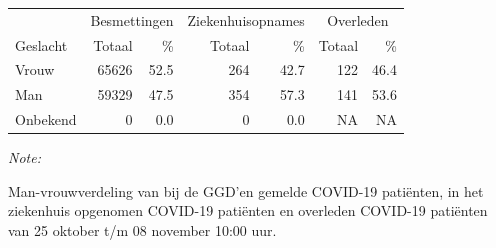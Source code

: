 \documentclass[
  english,
  man,floatsintext]{apa6}
\begin{document}
\begin{table}
\centering\begingroup\fontsize{11}{13}\selectfont

\begin{threeparttable}
\begin{tabular}{lrrrrrr}
\toprule
\multicolumn{1}{c}{ } & \multicolumn{2}{c}{Besmettingen} & \multicolumn{2}{c}{Ziekenhuisopnames} & \multicolumn{2}{c}{Overleden} \\
\cmidrule(l{3pt}r{3pt}){2-3} \cmidrule(l{3pt}r{3pt}){4-5} \cmidrule(l{3pt}r{3pt}){6-7}
Geslacht & Totaal & \% & Totaal & \% & Totaal & \%\\
\midrule
Vrouw & 65626 & 52.5 & 264 & 42.7 & 122 & 46.4\\
Man & 59329 & 47.5 & 354 & 57.3 & 141 & 53.6\\
Onbekend & 0 & 0.0 & 0 & 0.0 & NA & NA\\
\bottomrule
\end{tabular}
\begin{tablenotes}
\item \textit{Note: } 
\item Man-vrouwverdeling van bij de GGD’en gemelde COVID-19 patiënten, in het ziekenhuis opgenomen COVID-19 patiënten en overleden COVID-19 patiënten van 25 oktober t/m 08 november 10:00 uur.
\end{tablenotes}
\end{threeparttable}
\endgroup{}
\end{table}
\newpage
\end{document}
